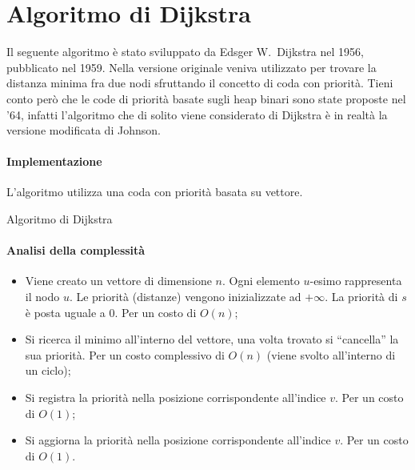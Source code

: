 \newpage
\section{Algoritmo di Dijkstra}

Il seguente algoritmo è stato sviluppato da Edsger W.\ Dijkstra nel 1956, pubblicato nel 1959.
Nella versione originale veniva utilizzato per trovare la distanza minima fra due nodi sfruttando il concetto di coda con priorità.
Tieni conto però che le code di priorità basate sugli heap binari sono state proposte nel '64, infatti l'algoritmo che di solito viene considerato di Dijkstra è in realtà la versione modificata di Johnson.

\paragraph{Implementazione}
L'algoritmo utilizza una coda con priorità basata su vettore.

\begin{algorithm}[H]
	\caption{Algoritmo di Dijkstra}
	\setcounter{AlgoLine}{0}
	
\end{algorithm}

\paragraph{Analisi della complessità}

\begin{itemize}
	\item[\circled{\ref{dijkstra:init}}]
	Viene creato un vettore di dimensione \(n\).
	Ogni elemento \(u\)-esimo rappresenta il nodo \(u\).
	Le priorità (distanze) vengono inizializzate ad \(+\infty\).
	La priorità di \(s\) è posta uguale a \(0\).
	Per un costo di \(O(n)\);

	\item[\circled{\ref{dijkstra:remove}}]
	Si ricerca il minimo all'interno del vettore, una volta trovato si \enquote{cancella} la sua priorità.
	Per un costo complessivo di \(O(n)\) (viene svolto all'interno di un ciclo);

	\item[\circled{\ref{dijkstra:add}}]
	Si registra la priorità nella posizione corrispondente all'indice \(v\).
	Per un costo di \(O(1)\);

	\item[\circled{\ref{dijkstra:update}}]
	Si aggiorna la priorità nella posizione corrispondente all'indice \(v\).
	Per un costo di \(O(1)\).
\end{itemize}

